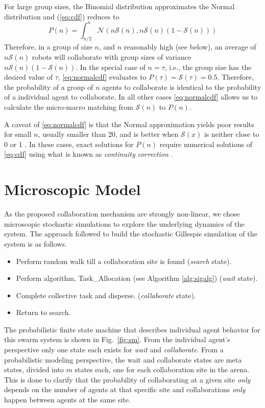 \documentclass{svmult}  %
\newcommand{\sig}{\mathcal{S}}
\begin{document}
For large group sizes, the Binomial distribution approximates the Normal distribution and (\ref{eq:cdf}) reduces to 
\begin{equation}
P(n)=\int_{n/2}^{n} \mathcal{N}(n\sig(n),n\sig(n)(1-\sig(n)))\label{eq:normalcdf}
\end{equation}
Therefore, in a group of size $n$, and $n$ reasonably high (see below), an average of $n\sig(n)$ robots will collaborate with group sizes of variance $n\sig(n)(1-\sig(n))$. In the special case of $n=\tau$, i.e., the group size has the desired value of $\tau$, \eqref{eq:normalcdf} evaluates to $P(\tau) = \sig(\tau)=0.5$. Therefore, the probability of a group of $n$ agents to collaborate is identical to the probability of a individual agent to collaborate. In all other cases \eqref{eq:normalcdf} allows us to calculate the micro-macro matching from $\sig(n)$ to $P(n)$.  

A caveat of \eqref{eq:normalcdf} is that the Normal approximation yields poor results for small $n$, usually smaller than 20, and is better when $\sig(x)$ is neither close to 0 or 1 \cite{Box1978}. In these cases, exact solutions for $P(n)$ require numerical solutions of \eqref{eq:cdf} using what is known as \emph{continuity correction} \cite{Feller1945}. 



\section{Microscopic Model}\label{sec:micromodel}
As the proposed collaboration mechanism are strongly non-linear, we chose microscopic stochastic simulations to explore the underlying dynamics of the system. The approach followed to build the stochastic Gillespie simulation of the system is as follows.
\begin{itemize}
\item Perform random walk till a collaboration site is found (\emph{search} state).
\item Perform algorithm, Task\_Allocation (see Algorithm \ref{alg:sigalg}) (\emph{wait} state).
\item Complete collective task and disperse. (\emph{collaborate} state).
\item Return to search.
\end{itemize}

The probabilistic finite state machine that describes individual agent behavior for this swarm system is shown in Fig.~\ref{fig:sm}. From the individual agent's perspective only one state each exists for \emph{wait} and \emph{collaborate}. From a probabilistic modeling perspective, the wait and collaborate states are meta states, divided into $m$ states each, one for each collaboration site in the arena. This is done to clarify that the probability of collaborating at a given site \emph{only} depends on the number of agents at that specific site and collaborations \emph{only} happen between agents at the same site.
\end{document}
